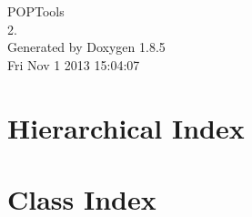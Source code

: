 \documentclass[twoside]{book}
\newcommand{\clearemptydoublepage}{%
  \newpage{\pagestyle{empty}\cleardoublepage}%
}
\begin{document}
\hypersetup{pageanchor=false}
\begin{titlepage}
\vspace*{7cm}
\begin{center}%
{\Large P\-O\-P\-Tools \\[1ex]\large 2. }\\
\vspace*{1cm}
{\large Generated by Doxygen 1.8.5}\\
\vspace*{0.5cm}
{\small Fri Nov 1 2013 15:04:07}\\
\end{center}
\end{titlepage}
\clearemptydoublepage
\tableofcontents
\clearemptydoublepage
{}
\hypersetup{pageanchor=true}

\chapter{Hierarchical Index}

\chapter{Class Index}

\end{document}
